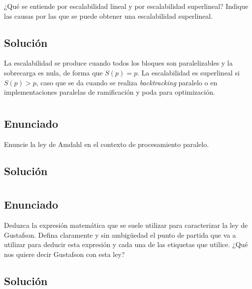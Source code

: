 ¿Qué se entiende por escalabilidad lineal y por escalabilidad superlineal? Indique las causas por las que se puede obtener una escalabilidad superlineal.

\subsection{Solución}

La escalabilidad se produce cuando todos los bloques son paralelizables y la sobrecarga es nula, de forma que $S(p)=p$.
La escalabilidad es superlineal si $S(p)>p$, caso que se da cuando se realiza \textit{backtracking} paralelo o en implementaciones paralelas de ramificación y poda para optimización.

\section{}\label{ej-2-4}

\subsection{Enunciado}

Enuncie la ley de Amdahl en el contexto de procesamiento paralelo.

\subsection{Solución}

\section{}\label{ej-2-5}

\subsection{Enunciado}

Deduzca la expresión matemática que se suele utilizar para caracterizar la ley de Gustafson.
Defina claramente y sin ambigüedad el punto de partida que va a utilizar para deducir esta expresión y cada una de las etiquetas que utilice.
¿Qué nos quiere decir Gustafson con esta ley?

\subsection{Solución}

\section{}\label{ej-2-6}

